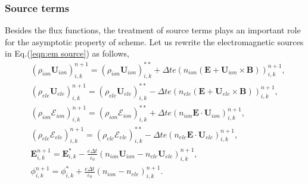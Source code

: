 \documentclass[preprint,3p,12pt,sort&compress]{elsarticle}
\begin{document}
\subsubsection{Source terms}

Besides the flux functions, the treatment of source terms plays an important role for the asymptotic property of scheme.
Let us rewrite the electromagnetic sources in Eq.(\ref{eqn:em source}) as follows,
\begin{equation}
\begin{aligned}
	& (\rho_{ion} \mathbf U_{ion})^{n+1}_{i,k} = (\rho_{ion} \mathbf U_{ion})^{**}_{i,k}
	+ \Delta t e \left( n_{ion} (\mathbf E+\mathbf U_{ion} \times \mathbf B) \right)_{i,k}^{n+1}, \\
	& (\rho_{ele} \mathbf U_{ele})^{n+1}_{i,k} = (\rho_{ele} \mathbf U_{ele})^{**}_{i,k}
	- \Delta t e \left( n_{ele} (\mathbf E+\mathbf U_{ele} \times \mathbf B) \right)_{i,k}^{n+1}, \\
	& (\rho_{ion} \mathscr E_{ion})_{i,k}^{n+1} = (\rho_{ion} \mathscr E_{ion})_{i,k}^{**}
	+ \Delta t e (n_{ion} \mathbf E \cdot \mathbf U_{ion})_{i,k}^{n+1}, \\
	& (\rho_{ele} \mathscr E_{ele})_{i,k}^{n+1} = (\rho_{ele} \mathscr E_{ele})_{i,k}^{**}
	- \Delta t e (n_{ele} \mathbf E \cdot \mathbf U_{ele})_{i,k}^{n+1}, \\
	&{\mathbf{E}}_{i,k}^{n+1}={\mathbf{E}}_{i,k}^{*}
	-\frac{e \Delta t}{\varepsilon_0}\left( { n }_{ion} \mathbf U_{ion} - n_{ele} { \mathbf U}_{ele} \right)^{n+1}_{i,k}, \\
	&{{\phi}}_{i,k}^{n+1}={{\phi}}_{i,k}^{*} 
	+\frac{e \Delta t}{\varepsilon_0}\left({n}_{ion}-{n}_{ele} \right)^{n+1}_{i,k} .
\end{aligned}
\label{eqn:cell em source}
\end{equation}
\end{document}
